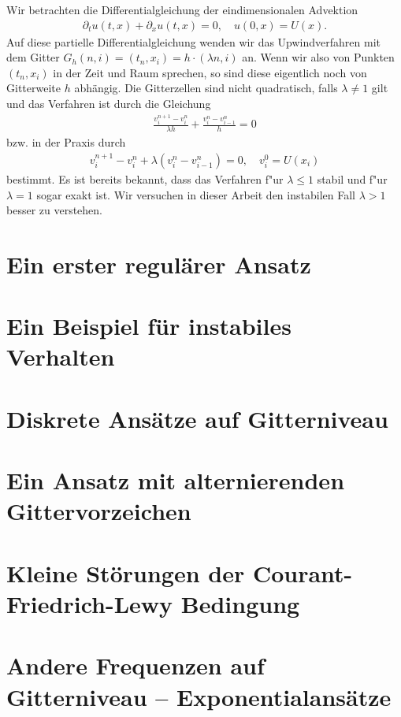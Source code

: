 
Wir betrachten die Differentialgleichung der eindimensionalen Advektion
\begin{align}\label{eq:adv:pde}
\partial_t u(t, x) + \partial_x u(t, x) = 0, \quad u(0, x) = U(x).
\end{align}
Auf diese partielle Differentialgleichung wenden wir das Upwindverfahren mit dem Gitter $G_h(n,i) = (t_n, x_i) = h \cdot (\lambda n, i)$ an.
Wenn wir also von Punkten $(t_n, x_i)$ in der Zeit und Raum sprechen, so sind diese eigentlich noch von Gitterweite $h$ abhängig. 
Die Gitterzellen sind nicht quadratisch, falls $\lambda \neq 1$ gilt und das Verfahren ist durch die Gleichung
\begin{align}\label{eq:adv:scheme_rechnung}
\frac {v^{n+1}_i - v^n_i} {\lambda h} + \frac {v^n_i - v^n_{i-1}} h = 0
\end{align}
bzw. in der Praxis durch
\begin{align}\label{eq:adv:scheme}
v^{n+1}_i - v^n_i + \lambda (v^n_i - v^n_{i-1}) = 0, \quad v^0_i = U(x_i)
\end{align}
bestimmt.
Es ist bereits bekannt, dass das Verfahren f"ur $\lambda \leq 1$ stabil und f"ur $\lambda = 1$ sogar exakt ist.
Wir versuchen in dieser Arbeit den instabilen Fall $\lambda > 1$ besser zu verstehen.

\section{Ein erster regulärer Ansatz}\label{sec:regulaer}



\section{Ein Beispiel für instabiles Verhalten}\label{sec:transport:beispiel}



\section {Diskrete Ansätze auf Gitterniveau} \label{sec:transport:diskret}



\section {Ein Ansatz mit alternierenden Gittervorzeichen}\label{sec:transport:osz}



\section{Kleine Störungen der Courant-Friedrich-Lewy Bedingung}\label{sec:transport:kleineta}



\section{Andere Frequenzen auf Gitterniveau -- Exponentialansätze}

